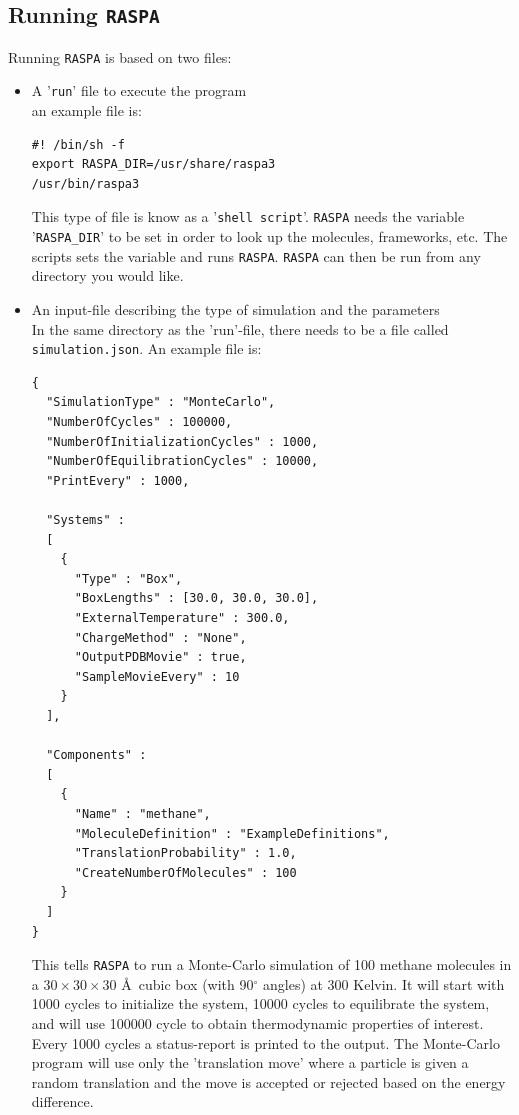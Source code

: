 \subsection{Running \texttt{RASPA}\label{Introduction: running RASPA}}
Running \texttt{RASPA} is based on two files:
\begin{itemize}
  \item{A '\texttt{run}' file to execute the program}\\
  an example file is:
\begin{verbatim}
#! /bin/sh -f
export RASPA_DIR=/usr/share/raspa3
/usr/bin/raspa3
\end{verbatim}
    This type of file is know as a '\texttt{shell script}'. \texttt{RASPA} needs the variable '\texttt{RASPA\_DIR}' to be set in order
    to look up the molecules, frameworks, etc. The scripts sets the variable and runs \texttt{RASPA}. \texttt{RASPA} can then be run
  from any directory you would like.
 \item{An input-file describing the type of simulation and the parameters}\\
  In the same directory as the 'run'-file, there needs to be a file called \verb+simulation.json+. An example file is:
\begin{verbatim}
{
  "SimulationType" : "MonteCarlo",
  "NumberOfCycles" : 100000,
  "NumberOfInitializationCycles" : 1000,
  "NumberOfEquilibrationCycles" : 10000,
  "PrintEvery" : 1000,

  "Systems" :
  [
    {
      "Type" : "Box",
      "BoxLengths" : [30.0, 30.0, 30.0],
      "ExternalTemperature" : 300.0,
      "ChargeMethod" : "None",
      "OutputPDBMovie" : true,
      "SampleMovieEvery" : 10
    }
  ],

  "Components" :
  [
    {
      "Name" : "methane",
      "MoleculeDefinition" : "ExampleDefinitions",
      "TranslationProbability" : 1.0,
      "CreateNumberOfMolecules" : 100
    }
  ]
}
\end{verbatim}
    This tells \texttt{RASPA} to run a Monte-Carlo simulation of 100 methane molecules in a $30\times30\times30$ \AA\ cubic box (with 90$^\circ$ angles)
  at 300 Kelvin. It will start with 1000 cycles to initialize the system,
    10000 cycles to equilibrate the system, and will use 100000 cycle to obtain thermodynamic properties
  of interest. Every 1000 cycles a status-report is printed to the output. The Monte-Carlo program will use only the 'translation move'
  where a particle is given a random translation and the move is accepted or rejected based on the energy difference.
  \end{itemize}


